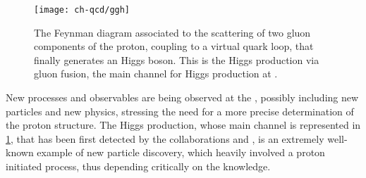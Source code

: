 \begin{figure}
	\centering
	\texttt{[image: ch-qcd/ggh]}
	\caption{
		The \lo Feynman diagram associated to the scattering of two gluon
		components of the proton, coupling to a virtual quark loop, that
		finally generates an Higgs boson.
		This is the Higgs production via gluon fusion, the main channel for
		Higgs production at \lhc.
	}
	\label{fig:qcd/ggh}
\end{figure}

New processes and observables are being observed at the \lhc, possibly
including new particles and new physics, stressing the need for a more precise
determination of the proton structure.
%
The Higgs production, whose main channel is represented in \cref{fig:qcd/ggh},
that has been first detected by the \lhc collaborations \atlas
\cite{ATLAS:2012yve} and \cms \cite{CMS:2012qbp}, is an extremely well-known
example of new particle discovery, which heavily involved a proton initiated
process, thus depending critically on the \pdfs knowledge.
